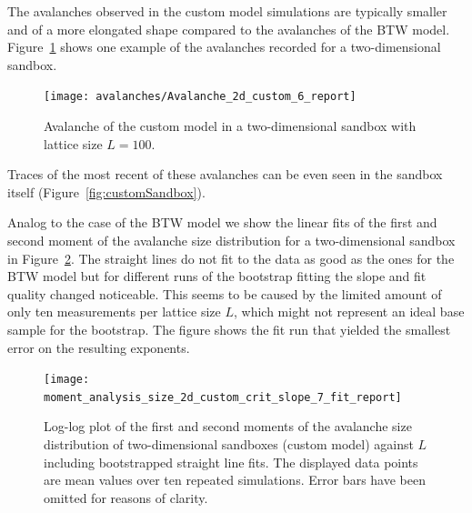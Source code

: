 The avalanches observed in the custom model simulations are typically smaller and of a more elongated shape compared
to the avalanches of the BTW model. Figure~\ref{fig:custom2DAvalanche} shows one example of the avalanches recorded
for a two-dimensional sandbox.
\begin{figure}[htb]
    \centering
    \texttt{[image: avalanches/Avalanche\_2d\_custom\_6\_report]}
    \caption{Avalanche of the custom model in a two-dimensional sandbox with lattice size $L=100$.}
    \label{fig:custom2DAvalanche}
\end{figure}
Traces of the most recent of these avalanches can be even seen in the sandbox itself (Figure~\ref{fig:customSandbox}).

Analog to the case of the BTW model we show the linear fits of the first and second moment of the avalanche size
distribution for a two-dimensional sandbox in Figure~\ref{fig:customSizeFit}.
The straight lines do not fit to the data as good as the ones for the BTW model but for different runs of the
bootstrap fitting the slope and fit quality changed noticeable. This seems to be caused by the limited amount of only
ten measurements per lattice size $L$, which might not represent an ideal base sample for the bootstrap.
The figure shows the fit run that yielded the smallest error on the resulting exponents.
\begin{figure}[htb]
    \centering
    \texttt{[image: moment\_analysis\_size\_2d\_custom\_crit\_slope\_7\_fit\_report]}
    \caption{Log-log plot of the first and second moments of the avalanche size distribution of two-dimensional
             sandboxes (custom model) against $L$ including bootstrapped straight line fits.
             The displayed data points are mean values over ten repeated simulations.
             Error bars have been omitted for reasons of clarity.}
    \label{fig:customSizeFit}
\end{figure}

